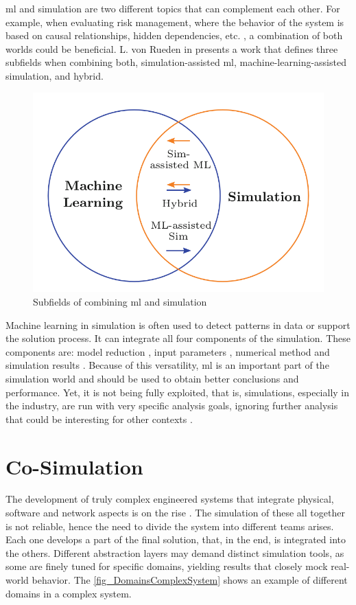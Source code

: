 \gls{ml} and simulation are two different topics that can complement each other. For example, when evaluating risk management, where the behavior of the system is based on causal relationships, hidden dependencies, etc. \cite{mitchell2017natural}, a combination of both worlds could be beneficial.  L. von Rueden in \cite{von2020combining} presents a work that defines three subfields when combining both, simulation-assisted \gls{ml}, machine-learning-assisted simulation, and hybrid.

\begin{figure}[H]
	\centering
 	\includegraphics[width=0.5\linewidth]{Images/SimAndML.png}
 	\caption{Subfields of combining \gls{ml} and simulation \cite{von2020combining}}
	 \label{fig_AdalineSquematic}
\end{figure}

Machine learning in simulation is often used to detect patterns in data or support the solution process. It can integrate all four components of the simulation. These components are: model reduction \cite{benner2015survey}, input parameters \cite{tsymbalov2019deeper}, numerical method \cite{noe2020machine} and simulation results \cite{albertsson2018machine}. Because of this versatility, \gls{ml} is an important part of the simulation world and should be used to obtain better conclusions and performance. Yet, it is not being fully exploited, that is, simulations, especially in the industry, are run with very specific analysis goals, ignoring further analysis that could be interesting for other contexts \cite{von2020combining}.

\section{Co-Simulation}

The development of truly complex engineered systems that integrate physical, software and network aspects is on the rise \cite{gomes2017co}. The simulation of these all together is not reliable, hence the need to divide the system into different teams arises. Each one develops a part of the final solution, that, in the end, is integrated into the others. Different abstraction layers may demand distinct simulation tools, as some are finely tuned for specific domains, yielding results that closely mock real-world behavior. The \autoref{fig_DomainsComplexSystem} shows an example of different domains in a complex system. 

